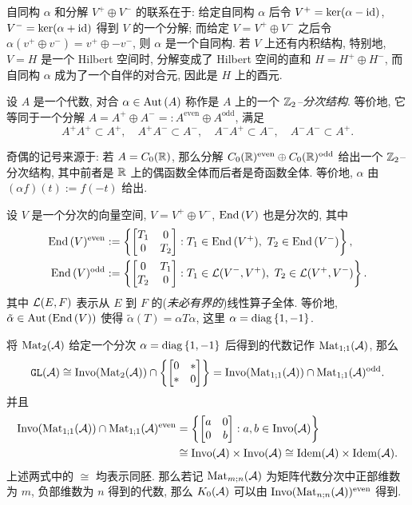 自同构 $ \alpha $ 和分解 $ V^+\oplus V^- $ 的联系在于: 给定自同构 $ \alpha $ 后令 $ V^+=\ker(\alpha-\mathrm{id}) $, $ V^-=\ker(\alpha+\mathrm{id}) $ 得到 $ V $ 的一个分解; 而给定 $ V=V^+\oplus V^- $ 之后令 $ \alpha(v^+\oplus v^-)=v^+\oplus-v^- $, 则 $ \alpha $ 是一个自同构. 若 $ V $ 上还有内积结构, 特别地, $ V=H $ 是一个 Hilbert 空间时, 分解变成了 Hilbert 空间的直和 $ H=H^+\oplus H^- $, 而自同构 $ \alpha $ 成为了一个自伴的对合元, 因此是 $ H $ 上的酉元.

\begin{Definition}[$ \Z_2 $--分次结构]
	设 $ A $ 是一个代数, 对合 $ \alpha\in\mathrm{Aut}\,(A) $ 称作是 $ A $ 上的一个 $ \Z_2 $\emph{--分次结构}. 等价地, 它等同于一个分解 $ A=A^+\oplus A^-=:A^{\text{even}}\oplus A^{\text{odd}} $, 满足
	\[
		A^+A^+\subset A^+,\quad A^+A^-\subset A^-,\quad A^-A^+\subset A^-,\quad A^-A^-\subset A^+.
	\]
\end{Definition}

奇偶的记号来源于: 若 $ A=C_0(\mathbb{R}) $, 那么分解 $ C_0(\mathbb{R})^{\text{even}}\oplus C_0(\mathbb{R})^{\text{odd}} $ 给出一个 $ \Z_2 $--分次结构, 其中前者是 $ \mathbb{R} $ 上的偶函数全体而后者是奇函数全体. 等价地, $ \alpha $ 由 $ (\alpha f)(t):=f(-t) $ 给出.

\begin{Example}
	设 $ V $ 是一个分次的向量空间, $ V=V^+\oplus V^- $, $ \mathrm{End}\,(V) $ 也是分次的, 其中
	\[
		\begin{aligned}
			\End(V)^{\text{even}}&:=\set{\mqty[T_1 & 0 \\ 0 & T_2] : T_1\in\End(V^+),\ T_2\in\End(V^-)},\\
			\End(V)^{\text{odd}}&:=\set{\mqty[0 & T_1 \\ T_2 & 0] : T_1\in\CL(V^-,V^+),\ T_2\in\CL(V^+,V^-)}.
		\end{aligned}
	\]
	其中 $ \mathcal{L}(E,F) $ 表示从 $ E $ 到 $ F $ 的(\textit{未必有界的})线性算子全体. 等价地, $ \tilde{\alpha}\in\mathrm{Aut}\,(\mathrm{End}\,(V)) $ 使得 $ \tilde{\alpha}(T)=\alpha T\alpha $, 这里 $ \alpha=\operatorname{diag}\left\{ 1,-1 \right\} $.
\end{Example}

将 $ \mathrm{Mat}_2(\mathcal{A}) $ 给定一个分次 $ \alpha=\operatorname{diag}\left\{ 1,-1 \right\} $ 后得到的代数记作 $ \mathrm{Mat}_{1;1}(\mathcal{A}) $, 那么
\[
	\GL(\CA)\cong\text{Invo}(\Mat_2(\CA))\cap\set{\mqty[0 & * \\ * & 0]}=\text{Invo}(\Mat_{1;1}(\CA))\cap\Mat_{1;1}(\CA)^{\text{odd}}.
\]
并且
\[
	\begin{aligned}
		\text{Invo}(\Mat_{1;1}(\CA))\cap\Mat_{1;1}(\CA)^{\text{even}}&=\set{\mqty[a & 0 \\ 0 & b] : a,b\in\text{Invo}(\CA)}\\
		&\cong\text{Invo}(\CA)\times\text{Invo}(\CA)\cong\text{Idem}(\CA)\times\text{Idem}(\CA).
	\end{aligned}
\]
上述两式中的 $ \cong $ 均表示同胚. 那么若记 $ \mathrm{Mat}_{m;n}(\mathcal{A}) $ 为矩阵代数分次中正部维数为 $ m $, 负部维数为 $ n $ 得到的代数, 那么 $ K_0(\mathcal{A}) $ 可以由 $ \text{Invo}(\mathrm{Mat}_{n;n}(\mathcal{A}))^{\text{even}} $ 得到.

